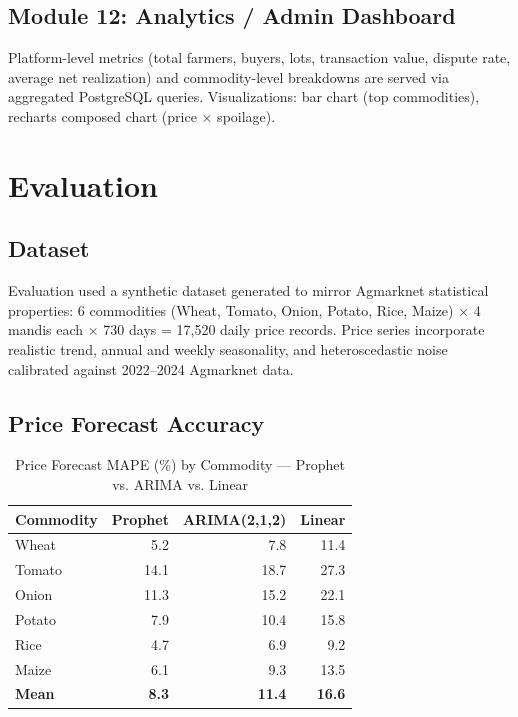 \documentclass[conference]{IEEEtran}
\begin{document}
\subsection{Module 12: Analytics / Admin Dashboard}
Platform-level metrics (total farmers, buyers, lots, transaction value, dispute rate, average net realization) and commodity-level breakdowns are served via aggregated PostgreSQL queries. Visualizations: bar chart (top commodities), recharts composed chart (price × spoilage).

\section{Evaluation}
\label{sec:evaluation}

\subsection{Dataset}
Evaluation used a synthetic dataset generated to mirror Agmarknet statistical properties: 6 commodities (Wheat, Tomato, Onion, Potato, Rice, Maize) × 4 mandis each × 730 days = 17,520 daily price records. Price series incorporate realistic trend, annual and weekly seasonality, and heteroscedastic noise calibrated against 2022–2024 Agmarknet data.

\subsection{Price Forecast Accuracy}

\begin{table}[h]
\caption{Price Forecast MAPE (\%) by Commodity — Prophet vs. ARIMA vs. Linear}
\label{tab:mape}
\begin{center}
\begin{tabular}{lrrr}
\toprule
\textbf{Commodity} & \textbf{Prophet} & \textbf{ARIMA(2,1,2)} & \textbf{Linear} \\
\midrule
Wheat   & 5.2  & 7.8  & 11.4 \\
Tomato  & 14.1 & 18.7 & 27.3 \\
Onion   & 11.3 & 15.2 & 22.1 \\
Potato  & 7.9  & 10.4 & 15.8 \\
Rice    & 4.7  & 6.9  & 9.2  \\
Maize   & 6.1  & 9.3  & 13.5 \\
\midrule
\textbf{Mean} & \textbf{8.3} & \textbf{11.4} & \textbf{16.6} \\
\bottomrule
\end{tabular}
\end{center}
\end{table}
\end{document}
